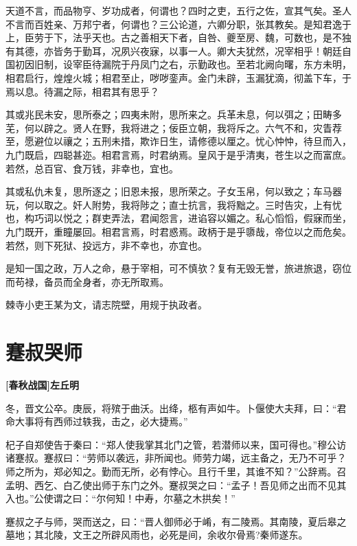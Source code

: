 \documentclass[UTF8,titlepage,oneside]{ctexbook}
\begin{document}
天道不言，而品物亨、岁功成者，何谓也？四时之吏，五行之佐，宣其气矣。圣人不言而百姓亲、万邦宁者，何谓也？三公论道，六卿分职，张其教矣。是知君逸于上，臣劳于下，法乎天也。古之善相天下者，自咎、夔至房、魏，可数也，是不独有其德，亦皆务于勤耳，况夙兴夜寐，以事一人。卿大夫犹然，况宰相乎！朝廷自国初因旧制，设宰臣待漏院于丹凤门之右，示勤政也。至若北阙向曙，东方未明，相君启行，煌煌火城；相君至止，哕哕銮声。金门未辟，玉漏犹滴，彻盖下车，于焉以息。待漏之际，相君其有思乎？

其或兆民未安，思所泰之；四夷未附，思所来之。兵革未息，何以弭之；田畴多芜，何以辟之。贤人在野，我将进之；佞臣立朝，我将斥之。六气不和，灾眚荐至，愿避位以禳之；五刑未措，欺诈日生，请修德以厘之。忧心忡忡，待旦而入，九门既启，四聪甚迩。相君言焉，时君纳焉。皇风于是乎清夷，苍生以之而富庶。若然，总百官、食万钱，非幸也，宜也。

其或私仇未复，思所逐之；旧恩未报，思所荣之。子女玉帛，何以致之；车马器玩，何以取之。奸人附势，我将陟之；直士抗言，我将黜之。三时告灾，上有忧也，构巧词以悦之；群吏弄法，君闻怨言，进谄容以媚之。私心慆慆，假寐而坐，九门既开，重瞳屡回。相君言焉，时君惑焉。政柄于是乎隳哉，帝位以之而危矣。若然，则下死狱、投远方，非不幸也，亦宜也。

是知一国之政，万人之命，悬于宰相，可不慎欤？复有无毁无誉，旅进旅退，窃位而苟禄，备员而全身者，亦无所取焉。

棘寺小吏王某为文，请志院壁，用规于执政者。


\chapter*{蹇叔哭师}
\begin{center}
	\textbf{[春秋战国]左丘明}
\end{center}


冬，晋文公卒。庚辰，将殡于曲沃。出绛，柩有声如牛。卜偃使大夫拜，曰：“君命大事将有西师过轶我，击之，必大捷焉。”


杞子自郑使告于秦曰：“郑人使我掌其北门之管，若潜师以来，国可得也。”穆公访诸蹇叔。蹇叔曰：“劳师以袭远，非所闻也。师劳力竭，远主备之，无乃不可乎？师之所为，郑必知之。勤而无所，必有悖心。且行千里，其谁不知？”公辞焉。召孟明、西乞、白乙使出师于东门之外。蹇叔哭之曰：“孟子！吾见师之出而不见其入也。”公使谓之曰：“尔何知！中寿，尔墓之木拱矣！”


蹇叔之子与师，哭而送之，曰：“晋人御师必于崤，有二陵焉。其南陵，夏后皋之墓地；其北陵，文王之所辟风雨也，必死是间，余收尔骨焉?秦师遂东。
\end{document}
